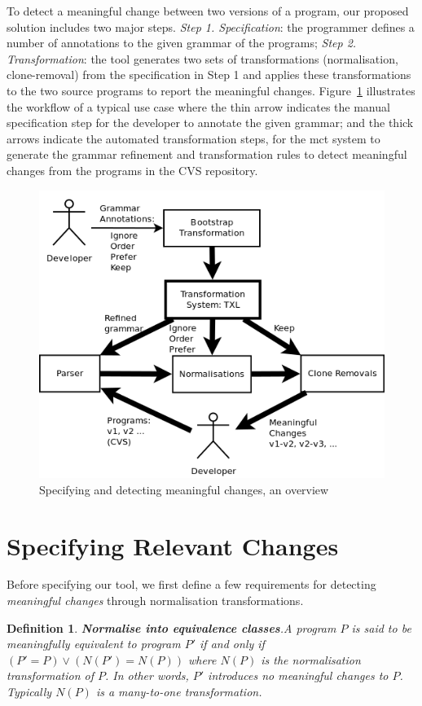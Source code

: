\documentclass[10pt, conference, compsocconf]{IEEEtran}
\newtheorem{definition}{Definition}
\begin{document}
To detect a meaningful change between two versions of a program, our proposed solution includes two major steps. {\em Step 1. Specification}: the programmer defines a number of annotations to the given grammar of the programs; {\em Step 2. Transformation}: the tool generates two sets of transformations (normalisation, clone-removal) from the specification in Step 1 and applies these transformations to the two source programs to report the meaningful changes. Figure~\ref{fig:overview} illustrates the workflow of a typical use case where the thin arrow indicates the manual specification step for the developer to annotate the given grammar; and the thick arrows indicate the automated transformation steps, for the mct system to generate the grammar refinement and transformation rules to detect meaningful changes from the programs in the CVS repository. 
\begin{figure}\centering
\includegraphics[width=\columnwidth]{code/overview}
\caption{Specifying and detecting meaningful changes, an overview}\label{fig:overview}
\end{figure}

\section{Specifying Relevant Changes}\label{sec:approach}

Before specifying our tool, we first define a few requirements for detecting {\em meaningful changes} through normalisation transformations.
\begin{definition}
{\bf Normalise into equivalence classes}.\label{defn:norm} A program $P$ is said to be {\em meaningfully equivalent} to program $P'$ if and only if $(P'=P) \vee (N(P') = N(P))$ where $N(P)$ is the normalisation transformation of $P$. In other words, $P'$ introduces no meaningful changes to $P$. Typically $N(P)$ is a many-to-one transformation.
\end{definition}
\end{document}
